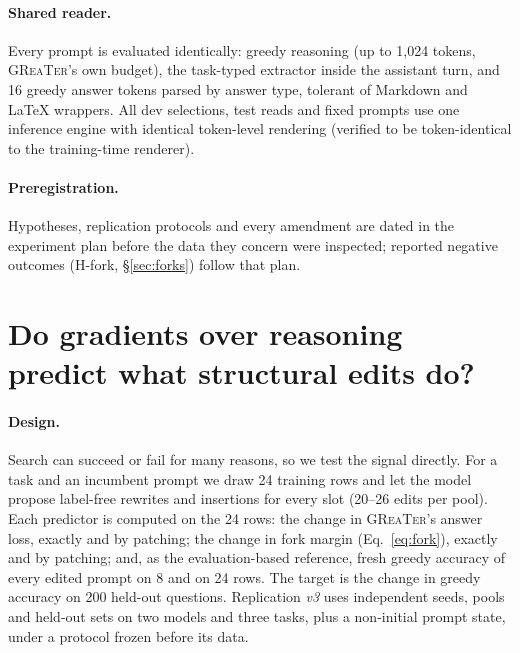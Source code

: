 \documentclass{article}
\newcommand{\greater}{\textsc{GReaTer}}
\begin{document}
\paragraph{Shared reader.} Every prompt is evaluated identically: greedy reasoning (up to
1{,}024 tokens, \greater{}'s own budget), the task-typed extractor inside the assistant
turn, and 16 greedy answer tokens parsed by answer type, tolerant of Markdown and
\LaTeX{} wrappers. All dev selections, test reads and fixed prompts use one inference
engine with identical token-level rendering (verified to be token-identical to the
training-time renderer).

\paragraph{Preregistration.} Hypotheses, replication protocols and every amendment are
dated in the experiment plan before the data they concern were inspected; reported
negative outcomes (H-fork, \S\ref{sec:forks}) follow that plan.

\section{Do gradients over reasoning predict what structural edits do?}
\label{sec:validity}

\paragraph{Design.} Search can succeed or fail for many reasons, so we test the signal
directly. For a task and an incumbent prompt we draw 24 training rows and let the model
propose label-free rewrites and insertions for every slot (20--26 edits per pool). Each
predictor is computed on the 24 rows: the change in \greater{}'s answer loss, exactly and
by patching; the change in fork margin (Eq.~\ref{eq:fork}), exactly and by patching; and,
as the evaluation-based reference, fresh greedy accuracy of every edited prompt on 8 and
on 24 rows. The target is the change in greedy accuracy on 200 held-out questions.
Replication \emph{v3} uses independent seeds, pools and held-out sets on two models and
three tasks, plus a non-initial prompt state, under a protocol frozen before its data.
\end{document}
